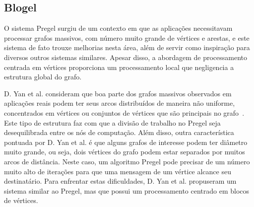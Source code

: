 \documentclass[conference]{IEEEtran}
\begin{document}
\subsection{Blogel}




O sistema Pregel surgiu de um contexto em que as aplicações necessitavam
processar grafos massivos, com número muito grande de vértices e
arestas, e este sistema de fato trouxe melhorias nesta área, além de
servir como inspiração para diversos outros sistemas similares. Apesar
disso, a abordagem de processamento centrada em vértices proporciona um
processamento local que negligencia a estrutura global do grafo.

D. Yan et al. consideram que boa parte dos grafos massivos observados em
aplicações reais podem ter seus arcos distribuídos de maneira não
uniforme, concentrados em vértices ou conjuntos de vértices que são
principais no grafo~\cite{blogel}. Este tipo de estrutura faz com que a
divisão de trabalho no Pregel seja desequilibrada entre os nós de
computação. Além disso, outra característica pontuada por D. Yan et al.
é que alguns grafos de interesse podem ter diâmetro muito grande, ou
seja, dois vértices do grafo podem estar separados por muitos arcos de
distância. Neste caso, um algoritmo Pregel pode precisar de um número
muito alto de iterações para que uma mensagem de um vértice alcance seu
destinatário. Para enfrentar estas dificuldades, D. Yan et al.
propuseram um sistema similar ao Pregel, mas que possui um processamento
centrado em blocos de vértices.
\end{document}
